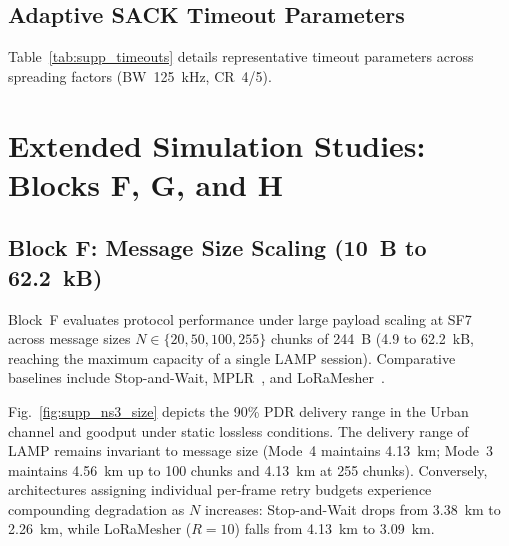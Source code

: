\documentclass[journal]{IEEEtran}
\begin{document}
\subsection{Adaptive SACK Timeout Parameters}
Table~\ref{tab:supp_timeouts} details representative timeout parameters across spreading factors (BW~125~kHz, CR~4/5).

\begin{table}[htpb]
\centering
\caption{Adaptive SACK Timeout Values (BW~125~kHz, CR~4/5, 8-symbol preamble, explicit header, PHY CRC on; 255-byte data frame, 14-byte SACK for $N=20$ chunks)}
\label{tab:supp_timeouts}
\renewcommand{\arraystretch}{1.15}
\footnotesize
{}
\end{table}

\section{Extended Simulation Studies: Blocks F, G, and H}
\label{sec:supp_sim}

\subsection{Block F: Message Size Scaling (10~B to 62.2~kB)}
Block~F evaluates protocol performance under large payload scaling at SF7 across message sizes $N \in \{20, 50, 100, 255\}$ chunks of 244~B (4.9 to 62.2~kB, reaching the maximum capacity of a single LAMP session). Comparative baselines include Stop-and-Wait, MPLR~\cite{mplr-chen2019}, and LoRaMesher~\cite{sole2026largetransfer}.

Fig.~\ref{fig:supp_ns3_size} depicts the 90\% PDR delivery range in the Urban channel and goodput under static lossless conditions. The delivery range of LAMP remains invariant to message size (Mode~4 maintains 4.13~km; Mode~3 maintains 4.56~km up to 100 chunks and 4.13~km at 255 chunks). Conversely, architectures assigning individual per-frame retry budgets experience compounding degradation as $N$ increases: Stop-and-Wait drops from 3.38~km to 2.26~km, while LoRaMesher ($R=10$) falls from 4.13~km to 3.09~km.
\end{document}

